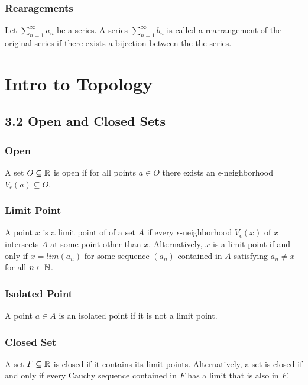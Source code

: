 \documentclass{article}
\begin{document}
\subsubsection*{Rearagements}
Let $\sum_{n=1}^{\infty} a_n$ be a series. A series $\sum_{n=1}^{\infty} b_n$ is called a rearrangement of the original series if there exists a bijection between the the series.

\section{Intro to Topology}
\subsection*{3.2 Open and Closed Sets}
\subsubsection*{Open}
A set $O \subseteq \protect\mathbb{R}$ is open if for all points $a \in O$ there exists an $\epsilon$-neighborhood $V_{\epsilon}(a) \subseteq O$.

\subsubsection*{Limit Point}
A point $x$ is a limit point of of a set $A$ if every $\epsilon$-neighborhood $V_\epsilon (x)$ of $x$ intersects $A$ at some point other than $x$.
Alternatively, $x$ is a limit point if and only if $x=lim(a_n)$ for some sequence $(a_n)$ contained in $A$ satisfying $a_n \ne x$ for all $n \in \protect\mathbb{N}$.

\subsubsection*{Isolated Point}
A point $a \in A$ is an isolated point if it is not a limit point.

\subsubsection*{Closed Set}
A set $F \subseteq \protect\mathbb{R}$ is closed if it contains its limit points. Alternatively, a set is closed if and only if every Cauchy sequence contained in $F$ has a limit that is also in $F$.
\end{document}

